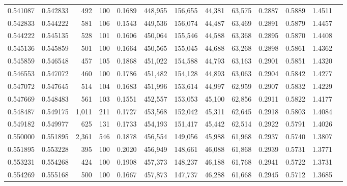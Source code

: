 \begin{tabular}{rrrrrrrrrrrrr}
0.541087 & 0.542833 &   492 & 100 &                                     0.1689 & 448,955 & 156,655 &  44,381 &  63,575 & 0.2887 & 0.5889 & 1.4511 \\
0.542833 & 0.544222 &   581 & 106 &                                     0.1543 & 449,536 & 156,074 &  44,487 &  63,469 & 0.2891 & 0.5879 & 1.4457 \\
0.544222 & 0.545135 &   528 & 101 &                                     0.1606 & 450,064 & 155,546 &  44,588 &  63,368 & 0.2895 & 0.5870 & 1.4408 \\
0.545136 & 0.545859 &   501 & 100 &                                     0.1664 & 450,565 & 155,045 &  44,688 &  63,268 & 0.2898 & 0.5861 & 1.4362 \\
0.545859 & 0.546548 &   457 & 105 &                                     0.1868 & 451,022 & 154,588 &  44,793 &  63,163 & 0.2901 & 0.5851 & 1.4320 \\
0.546553 & 0.547072 &   460 & 100 &                                     0.1786 & 451,482 & 154,128 &  44,893 &  63,063 & 0.2904 & 0.5842 & 1.4277 \\
0.547072 & 0.547645 &   514 & 104 &                                     0.1683 & 451,996 & 153,614 &  44,997 &  62,959 & 0.2907 & 0.5832 & 1.4229 \\
0.547669 & 0.548483 &   561 & 103 &                                     0.1551 & 452,557 & 153,053 &  45,100 &  62,856 & 0.2911 & 0.5822 & 1.4177 \\
0.548487 & 0.549175 & 1,011 & 211 &                                     0.1727 & 453,568 & 152,042 &  45,311 &  62,645 & 0.2918 & 0.5803 & 1.4084 \\
0.549182 & 0.549977 &   625 & 131 &                                     0.1733 & 454,193 & 151,417 &  45,442 &  62,514 & 0.2922 & 0.5791 & 1.4026 \\
0.550000 & 0.551895 & 2,361 & 546 &                                     0.1878 & 456,554 & 149,056 &  45,988 &  61,968 & 0.2937 & 0.5740 & 1.3807 \\
0.551895 & 0.553228 &   395 & 100 &                                     0.2020 & 456,949 & 148,661 &  46,088 &  61,868 & 0.2939 & 0.5731 & 1.3771 \\
0.553231 & 0.554268 &   424 & 100 &                                     0.1908 & 457,373 & 148,237 &  46,188 &  61,768 & 0.2941 & 0.5722 & 1.3731 \\
0.554269 & 0.555168 &   500 & 100 &                                     0.1667 & 457,873 & 147,737 &  46,288 &  61,668 & 0.2945 & 0.5712 & 1.3685 \\

\end{tabular}

